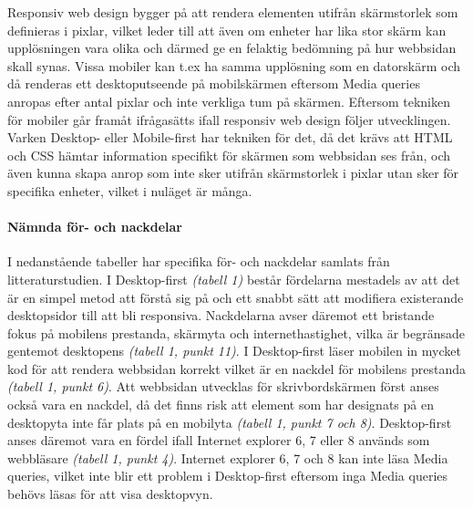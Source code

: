 \documentclass[11pt]{article}
\begin{document}
Responsiv web design bygger på att rendera elementen utifrån skärmstorlek som definieras i pixlar, vilket leder till att även om enheter har lika stor skärm kan upplösningen vara olika och därmed ge en felaktig bedömning på hur webbsidan skall synas. Vissa mobiler kan t.ex ha samma upplösning som en datorskärm och då renderas ett desktoputseende på mobilskärmen eftersom Media queries anropas efter antal pixlar och inte verkliga tum på skärmen. Eftersom tekniken för mobiler går framåt ifrågasätts ifall responsiv web design följer utvecklingen. Varken Desktop- eller Mobile-first har tekniken för det, då det krävs att HTML och CSS hämtar information specifikt för skärmen som webbsidan ses från, och även kunna skapa anrop som inte sker utifrån skärmstorlek i pixlar utan sker för specifika enheter, vilket i nuläget är många.


\paragraph{Nämnda för- och nackdelar}\mbox{}

I nedanstående tabeller har specifika för- och nackdelar samlats från litteraturstudien. I Desktop-first \textit{(tabell 1)} består fördelarna mestadels av att det är en simpel metod att förstå sig på och ett snabbt sätt att modifiera existerande desktopsidor till att bli responsiva. Nackdelarna avser däremot ett bristande fokus på mobilens prestanda, skärmyta och internethastighet, vilka är begränsade gentemot desktopens \textit{(tabell 1, punkt 11)}. I Desktop-first läser mobilen in mycket kod för att rendera webbsidan korrekt vilket är en nackdel för mobilens prestanda \textit{(tabell 1, punkt 6)}. Att webbsidan utvecklas för skrivbordskärmen först anses också vara en nackdel, då det finns risk att element som har designats på en desktopyta inte får plats på en mobilyta \textit{(tabell 1, punkt 7 och 8)}. Desktop-first anses däremot vara en fördel ifall Internet explorer 6, 7 eller 8 används som webbläsare \textit{(tabell 1, punkt 4)}. Internet explorer 6, 7 och 8 kan inte läsa Media queries, vilket inte blir ett problem i Desktop-first eftersom inga Media queries behövs läsas för att visa desktopvyn.
\end{document}
